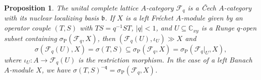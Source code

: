 \documentclass[12pt]{amsart}%
\theoremstyle{plain}
\newtheorem{proposition}{Proposition}
\numberwithin{equation}{section}
\numberwithin{equation}{section}
\numberwithin{theorem}{section}
\numberwithin{lemma}{section}
\numberwithin{remark}{section}
\numberwithin{example}{section}
\numberwithin{proposition}{section}
\numberwithin{definition}{section}
\numberwithin{corollary}{section}
\begin{document}
\begin{proposition}
\label{propQP1}The unital complete lattice $A$-category $\mathcal{F}_{q}$ is
\textit{a \v{C}ech }$A$-\textit{category} with its nuclear localizing basis
$\mathfrak{b}$. If $X$ is a left Fr\'{e}chet $A$-module given by an operator
couple $\left(  T,S\right)  $ with $TS=q^{-1}ST$, $\left\vert q\right\vert
<1$, and $U\subseteq\mathbb{C}_{xy}$ is a Runge $q$-open subset containing
$\sigma_{\operatorname{P}}\left(  \mathcal{F}_{q},X\right)  $, then $\left(
\mathcal{F}_{q}\left(  U\right)  ,\iota_{U}\right)  \gg X$ and
\[
\sigma\left(  \mathcal{F}_{q}\left(  U\right)  ,X\right)  =\sigma\left(
T,S\right)  \subseteq\sigma_{\operatorname{P}}\left(  \mathcal{F}%
_{q},X\right)  =\sigma_{\operatorname{P}}\left(  \mathcal{F}_{q}%
|_{U},X\right)  ,
\]
where $\iota_{U}:A\rightarrow\mathcal{F}_{q}\left(  U\right)  $ is the
restriction morphism. In the case of a left Banach $A$-module $X$, we have
$\sigma\left(  T,S\right)  ^{-\mathfrak{q}}=\sigma_{\operatorname{P}}\left(
\mathcal{F}_{q},X\right)  $.
\end{proposition}
\end{document}
